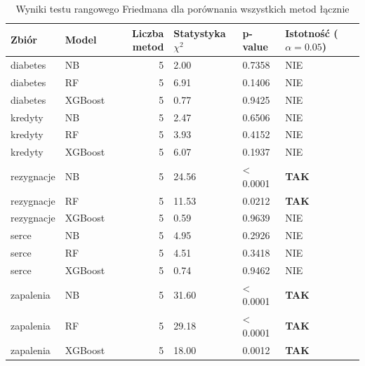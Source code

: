 \begin{table}[htbp]
\caption{Wyniki testu rangowego Friedmana dla porównania wszystkich metod łącznie}
\label{tab:test_friedman}
\begin{tabular}{llrlll}
\toprule
Zbiór & Model & Liczba metod & Statystyka $\chi^2$ & p-value & Istotność ($\alpha=0.05$) \\
\midrule
diabetes & NB & 5 & 2.00 & 0.7358 & NIE \\
diabetes & RF & 5 & 6.91 & 0.1406 & NIE \\
diabetes & XGBoost & 5 & 0.77 & 0.9425 & NIE \\
kredyty & NB & 5 & 2.47 & 0.6506 & NIE \\
kredyty & RF & 5 & 3.93 & 0.4152 & NIE \\
kredyty & XGBoost & 5 & 6.07 & 0.1937 & NIE \\
rezygnacje & NB & 5 & 24.56 & < 0.0001 & \textbf{TAK} \\
rezygnacje & RF & 5 & 11.53 & 0.0212 & \textbf{TAK} \\
rezygnacje & XGBoost & 5 & 0.59 & 0.9639 & NIE \\
serce & NB & 5 & 4.95 & 0.2926 & NIE \\
serce & RF & 5 & 4.51 & 0.3418 & NIE \\
serce & XGBoost & 5 & 0.74 & 0.9462 & NIE \\
zapalenia & NB & 5 & 31.60 & < 0.0001 & \textbf{TAK} \\
zapalenia & RF & 5 & 29.18 & < 0.0001 & \textbf{TAK} \\
zapalenia & XGBoost & 5 & 18.00 & 0.0012 & \textbf{TAK} \\
\bottomrule
\end{tabular}
\end{table}
